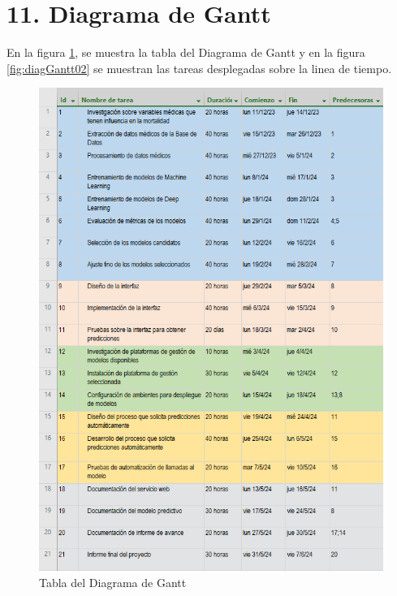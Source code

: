 \documentclass[
11pt, %
]{charter}
\begin{document}
\section{11. Diagrama de Gantt}
\label{sec:gantt}

En la figura \ref{fig:diagGantt01}, se muestra la tabla del Diagrama de Gantt y en la figura \ref{fig:diagGantt02} se muestran las tareas desplegadas sobre la linea de tiempo.

\begin{figure}[htpb]
\centering 
\includegraphics[height=.8\textheight]{./Figuras/Gantt-1.png}
\caption{Tabla del Diagrama de Gantt}
\label{fig:diagGantt01}
\end{figure}
\end{document}
